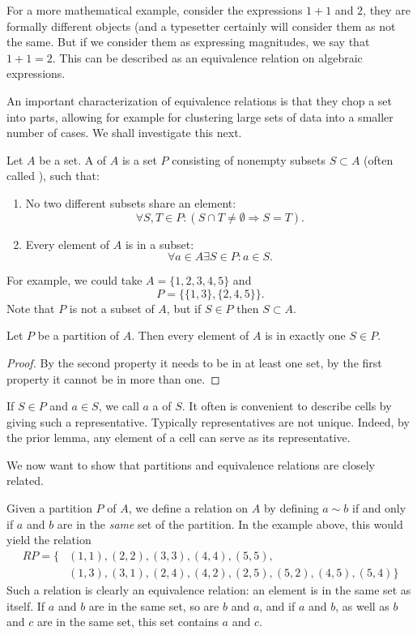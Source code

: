 For a more mathematical example, consider the expressions $1+1$ and $2$, they are formally
different objects (and a typesetter certainly will consider them as not
the same. But if we consider them as expressing magnitudes, we say that
$1+1=2$.
This can be described as an equivalence relation on algebraic expressions.
\medskip

An important characterization of equivalence relations is that they chop a
set into parts, allowing for example for clustering large sets of data into
a smaller number of cases. We shall investigate this next.
\begin{defn}
Let $A$ be a set. A  of $A$ is a set $P$ consisting of nonempty
subsets $S\subset A$ (often called ), such that:
\begin{enumerate}
\item No two different subsets share an element:
\[
\forall S,T\in P: (S\cap T\not=\emptyset\Rightarrow S=T).
\]
\item Every element of $A$ is in a subset:
\[
\forall a\in A\exists S\in P: a\in S.
\]
\end{enumerate}
\end{defn}
For example, we could take $A=\{1,2,3,4,5\}$ and
\[
P=\{\{1,3\},\{2,4,5\}\}.
\]
Note that $P$ is not a subset of $A$, but if $S\in P$ then $S\subset A$.

\begin{lemma}
Let $P$ be a partition of $A$. Then every element of $A$ is in exactly one $S\in P$.
\end{lemma}
\begin{proof}
By the second property it needs to be in at least one set, by the first property it
cannot be in more than one.
\end{proof}

If $S\in P$ and $a\in S$, we call $a$ a  of $S$.  It often is
convenient to describe cells by giving such a representative.
Typically representatives are not unique. Indeed, by the prior lemma, any
element of a cell can serve as its representative.
\bigskip

We now want to show that partitions and equivalence relations are closely related.

Given a partition $P$ of $A$, we define a relation on $A$ by
defining $a\sim b$ if and only if $a$ and $b$ are in the {\em same} set of
the partition. In the example above, this would yield the relation
\[
\begin{split}
RP=\{&(1,1),(2,2),(3,3),(4,4),(5,5),\\
&(1,3),(3,1),(2,4),(4,2),(2,5),(5,2),(4,5),(5,4)\}
\end{split}
\]
Such a relation is clearly an equivalence relation: an element is in the
same set as itself. If $a$ and $b$ are in the same set, so are $b$ and $a$,
and if $a$ and $b$, as well as $b$ and $c$ are in the same set, this set
contains $a$ and $c$.

